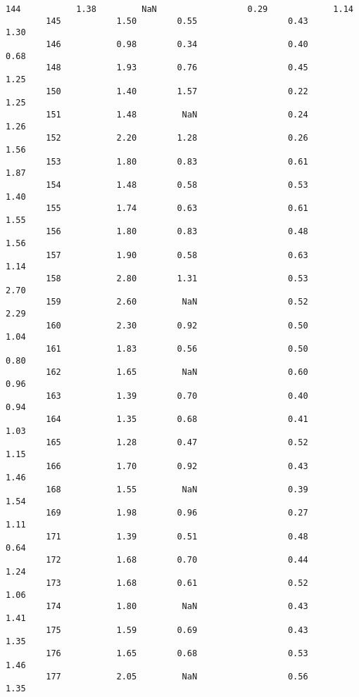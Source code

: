 \documentclass[11pt]{article}
\begin{document}
\begin{Verbatim}[commandchars=\\\{\}]
        144           1.38         NaN                  0.29             1.14   
        145           1.50        0.55                  0.43             1.30   
        146           0.98        0.34                  0.40             0.68   
        148           1.93        0.76                  0.45             1.25   
        150           1.40        1.57                  0.22             1.25   
        151           1.48         NaN                  0.24             1.26   
        152           2.20        1.28                  0.26             1.56   
        153           1.80        0.83                  0.61             1.87   
        154           1.48        0.58                  0.53             1.40   
        155           1.74        0.63                  0.61             1.55   
        156           1.80        0.83                  0.48             1.56   
        157           1.90        0.58                  0.63             1.14   
        158           2.80        1.31                  0.53             2.70   
        159           2.60         NaN                  0.52             2.29   
        160           2.30        0.92                  0.50             1.04   
        161           1.83        0.56                  0.50             0.80   
        162           1.65         NaN                  0.60             0.96   
        163           1.39        0.70                  0.40             0.94   
        164           1.35        0.68                  0.41             1.03   
        165           1.28        0.47                  0.52             1.15   
        166           1.70        0.92                  0.43             1.46   
        168           1.55         NaN                  0.39             1.54   
        169           1.98        0.96                  0.27             1.11   
        171           1.39        0.51                  0.48             0.64   
        172           1.68        0.70                  0.44             1.24   
        173           1.68        0.61                  0.52             1.06   
        174           1.80         NaN                  0.43             1.41   
        175           1.59        0.69                  0.43             1.35   
        176           1.65        0.68                  0.53             1.46   
        177           2.05         NaN                  0.56             1.35   
        

\end{Verbatim}
\end{document}
